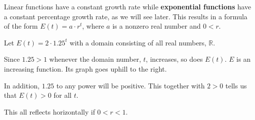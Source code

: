 \documentclass{ximera}
\begin{document}
Linear functions have a constant growth rate while \textbf{exponential functions} have a constant percentage growth rate, as we will see later.  This results in a formula of the form $E(t) = a \cdot r^t$, where $a$ is a nonzero real number and $0 < r$.



\begin{example}

Let $E(t) = 2 \cdot 1.25^t$ with a domain consisting of all real numbers, $\mathbb{R}$.


Since $1.25 > 1$ whenever the domain number, $t$, increases, so does $E(t)$.  $E$ is an increasing function.  Its graph goes uphill to the right.









\begin{image}
\end{image}





In addition, $1.25$ to any power will be positive.  This together with $2>0$ tells us that $E(t) > 0$ for all $t$.


\end{example}


This all reflects horizontally if $0 < r < 1$.
\end{document}
